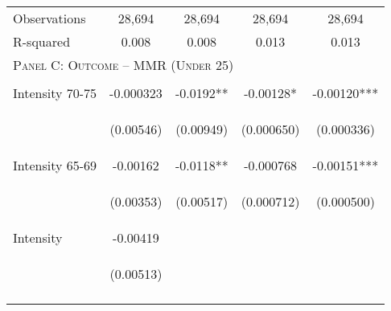 \begin{subtables}
\begin{table}[htpb!]
\begin{center}
\begin{tabular}{p{5cm}cccc}
Observations&28,694&28,694&28,694&28,694\\ 
R-squared&0.008&0.008&0.013&0.013\\ \midrule 
\multicolumn{5}{l}{\textsc{Panel C: Outcome -- MMR (Under 25)}}\\ 
\begin{footnotesize}\end{footnotesize}&\begin{footnotesize}\end{footnotesize}&\begin{footnotesize}\end{footnotesize}&\begin{footnotesize}\end{footnotesize}\\ 
Intensity 70-75&-0.000323&-0.0192**&-0.00128*&-0.00120***\\ 
&\begin{footnotesize}(0.00546)\end{footnotesize}&\begin{footnotesize}(0.00949)\end{footnotesize}&\begin{footnotesize}(0.000650)\end{footnotesize}&\begin{footnotesize}(0.000336)\end{footnotesize}\\ 
Intensity 65-69&-0.00162&-0.0118**&-0.000768&-0.00151***\\ 
&\begin{footnotesize}(0.00353)\end{footnotesize}&\begin{footnotesize}(0.00517)\end{footnotesize}&\begin{footnotesize}(0.000712)\end{footnotesize}&\begin{footnotesize}(0.000500)\end{footnotesize}\\ 
Intensity      &-0.00419&&&\\ 
&\begin{footnotesize}(0.00513)\end{footnotesize}&&\\ 
\begin{footnotesize}\end{footnotesize}&\begin{footnotesize}\end{footnotesize}&\begin{footnotesize}\end{footnotesize}&\begin{footnotesize}\end{footnotesize}\\ 

\end{tabular}
\end{center}
\end{table}
\end{subtables}
